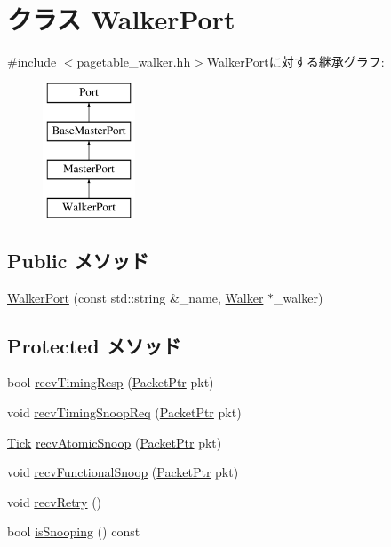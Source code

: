 \hypertarget{classX86ISA_1_1Walker_1_1WalkerPort}{
\section{クラス WalkerPort}
\label{classX86ISA_1_1Walker_1_1WalkerPort}
}


{\ttfamily \#include $<$pagetable\_\-walker.hh$>$}WalkerPortに対する継承グラフ:\begin{figure}[H]
\begin{center}
\leavevmode
\includegraphics[height=4cm]{classX86ISA_1_1Walker_1_1WalkerPort}
\end{center}
\end{figure}
\subsection*{Public メソッド}
\begin{DoxyCompactItemize}
\item 
\hyperlink{classX86ISA_1_1Walker_1_1WalkerPort_ab7603032aae051924e96f62a91a4e42d}{WalkerPort} (const std::string \&\_\-name, \hyperlink{classX86ISA_1_1Walker}{Walker} $\ast$\_\-walker)
\end{DoxyCompactItemize}
\subsection*{Protected メソッド}
\begin{DoxyCompactItemize}
\item 
bool \hyperlink{classX86ISA_1_1Walker_1_1WalkerPort_a482dba5588f4bee43e498875a61e5e0b}{recvTimingResp} (\hyperlink{classPacket}{PacketPtr} pkt)
\item 
void \hyperlink{classX86ISA_1_1Walker_1_1WalkerPort_aff3031c56fc4947a19695c868bb8233e}{recvTimingSnoopReq} (\hyperlink{classPacket}{PacketPtr} pkt)
\item 
\hyperlink{base_2types_8hh_a5c8ed81b7d238c9083e1037ba6d61643}{Tick} \hyperlink{classX86ISA_1_1Walker_1_1WalkerPort_a886d584c81ee4e398ff8069907f6e1a5}{recvAtomicSnoop} (\hyperlink{classPacket}{PacketPtr} pkt)
\item 
void \hyperlink{classX86ISA_1_1Walker_1_1WalkerPort_a284dfb90c168233c9d416bc07de8fefe}{recvFunctionalSnoop} (\hyperlink{classPacket}{PacketPtr} pkt)
\item 
void \hyperlink{classX86ISA_1_1Walker_1_1WalkerPort_a29cb5a4f98063ce6e9210eacbdb35298}{recvRetry} ()
\item 
bool \hyperlink{classX86ISA_1_1Walker_1_1WalkerPort_a5ce11b7a254d3cb756d94568f7cbc25d}{isSnooping} () const 
\end{DoxyCompactItemize}
